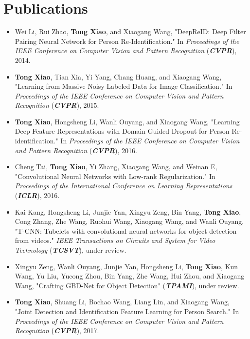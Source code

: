 \chapter*{Publications}

\begin{itemize}
  \item Wei Li, Rui Zhao, \textbf{Tong Xiao}, and Xiaogang Wang, "DeepReID: Deep Filter Pairing Neural Network for Person Re-Identification." In \textit{Proceedings of the IEEE Conference on Computer Vision and Pattern Recognition} (\textit{\textbf{CVPR}}), 2014.

  \item \textbf{Tong Xiao}, Tian Xia, Yi Yang, Chang Huang, and Xiaogang Wang, "Learning from Massive Noisy Labeled Data for Image Classification." In \textit{Proceedings of the IEEE Conference on Computer Vision and Pattern Recognition} (\textit{\textbf{CVPR}}), 2015.

  \item \textbf{Tong Xiao}, Hongsheng Li, Wanli Ouyang, and Xiaogang Wang, "Learning Deep Feature Representations with Domain Guided Dropout for Person Re-identification." In \textit{Proceedings of the IEEE Conference on Computer Vision and Pattern Recognition} (\textit{\textbf{CVPR}}), 2016.

  \item Cheng Tai, \textbf{Tong Xiao}, Yi Zhang, Xiaogang Wang, and Weinan E, "Convolutional Neural Networks with Low-rank Regularization." In \textit{Proceedings of the International Conference on Learning Representations} (\textit{\textbf{ICLR}}), 2016.

  \item Kai Kang, Hongsheng Li, Junjie Yan, Xingyu Zeng, Bin Yang, \textbf{Tong Xiao}, Cong Zhang, Zhe Wang, Ruohui Wang, Xiaogang Wang, and Wanli Ouyang, "T-CNN: Tubelets with convolutional neural networks for object detection from videos." \textit{IEEE Transactions on Circuits and System for Video Technology} (\textit{\textbf{TCSVT}}), under review.

  \item Xingyu Zeng, Wanli Ouyang, Junjie Yan, Hongsheng Li, \textbf{Tong Xiao}, Kun Wang, Yu Liu, Yucong Zhou, Bin Yang, Zhe Wang, Hui Zhou, and Xiaogang Wang, "Crafting GBD-Net for Object Detection" (\textit{\textbf{TPAMI}}), under review.

  \item \textbf{Tong Xiao}, Shuang Li, Bochao Wang, Liang Lin, and Xiaogang Wang, "Joint Detection and Identification Feature Learning for Person Search." In \textit{Proceedings of the IEEE Conference on Computer Vision and Pattern Recognition} (\textit{\textbf{CVPR}}), 2017.


\end{itemize}

